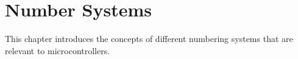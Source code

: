 \chapter{Number Systems}

This chapter introduces the concepts of different numbering systems that
are relevant to microcontrollers.